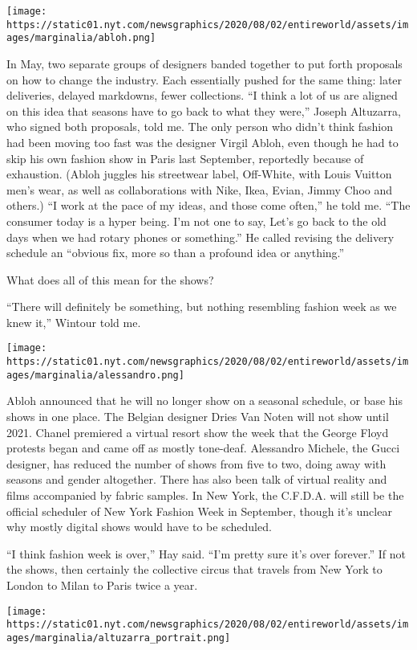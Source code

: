 \texttt{[image: https://static01.nyt.com/newsgraphics/2020/08/02/entireworld/assets/images/marginalia/abloh.png]}

In May, two separate groups of designers banded together to put forth
proposals on how to change the industry. Each essentially pushed for the
same thing: later deliveries, delayed markdowns, fewer collections. ``I
think a lot of us are aligned on this idea that seasons have to go back
to what they were,'' Joseph Altuzarra, who signed both proposals, told
me. The only person who didn't think fashion had been moving too fast
was the designer Virgil Abloh, even though he had to skip his own
fashion show in Paris last September, reportedly because of exhaustion.
(Abloh juggles his streetwear label, Off-White, with Louis Vuitton men's
wear, as well as collaborations with Nike, Ikea, Evian, Jimmy Choo and
others.) ``I work at the pace of my ideas, and those come often,'' he
told me. ``The consumer today is a hyper being. I'm not one to say,
Let's go back to the old days when we had rotary phones or something.''
He called revising the delivery schedule an ``obvious fix, more so than
a profound idea or anything.''

What does all of this mean for the shows?

``There will definitely be something, but nothing resembling fashion
week as we knew it,'' Wintour told me.

\texttt{[image: https://static01.nyt.com/newsgraphics/2020/08/02/entireworld/assets/images/marginalia/alessandro.png]}

Abloh announced that he will no longer show on a seasonal schedule, or
base his shows in one place. The Belgian designer Dries Van Noten will
not show until 2021. Chanel premiered a virtual resort show the week
that the George Floyd protests began and came off as mostly tone-deaf.
Alessandro Michele, the Gucci designer, has reduced the number of shows
from five to two, doing away with seasons and gender altogether. There
has also been talk of virtual reality and films accompanied by fabric
samples. In New York, the C.F.D.A. will still be the official scheduler
of New York Fashion Week in September, though it's unclear why mostly
digital shows would have to be scheduled.

``I think fashion week is over,'' Hay said. ``I'm pretty sure it's over
forever.'' If not the shows, then certainly the collective circus that
travels from New York to London to Milan to Paris twice a year.

\texttt{[image: https://static01.nyt.com/newsgraphics/2020/08/02/entireworld/assets/images/marginalia/altuzarra\_portrait.png]}

